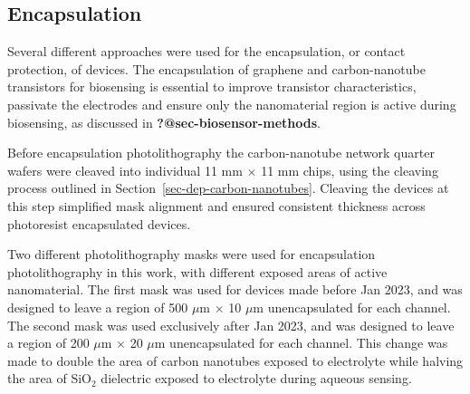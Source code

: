 \documentclass[
  a4paper,
]{scrbook}
\begin{document}
\hypertarget{sec-encapsulation}{%
\subsection{Encapsulation}\label{sec-encapsulation}}

Several different approaches were used for the encapsulation, or contact
protection, of devices. The encapsulation of graphene and
carbon-nanotube transistors for biosensing is essential to improve
transistor characteristics, passivate the electrodes and ensure only the
nanomaterial region is active during biosensing, as discussed in
\textbf{?@sec-biosensor-methods}.

Before encapsulation photolithography the carbon-nanotube network
quarter wafers were cleaved into individual 11 mm \(\times\) 11 mm
chips, using the cleaving process outlined in
Section~\ref{sec-dep-carbon-nanotubes}. Cleaving the devices at this
step simplified mask alignment and ensured consistent thickness across
photoresist encapsulated devices.

Two different photolithography masks were used for encapsulation
photolithography in this work, with different exposed areas of active
nanomaterial. The first mask was used for devices made before Jan 2023,
and was designed to leave a region of 500 \(\mu\)m \(\times\) 10
\(\mu\)m unencapsulated for each channel. The second mask was used
exclusively after Jan 2023, and was designed to leave a region of 200
\(\mu\)m \(\times\) 20 \(\mu\)m unencapsulated for each channel. This
change was made to double the area of carbon nanotubes exposed to
electrolyte while halving the area of SiO\(_2\) dielectric exposed to
electrolyte during aqueous sensing.
\end{document}
